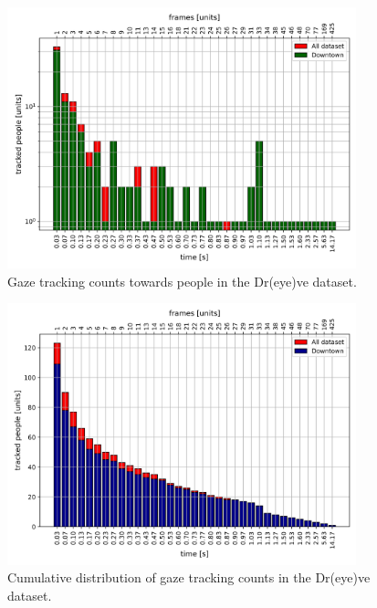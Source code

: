 \begin{figure}
    \centering
    \includegraphics[width=0.9\textwidth]{images/dreyeve/tracking_distrib.png}
    \caption{Gaze tracking counts towards people in the Dr(eye)ve dataset.}
    \label{fig:tracking_distribution}
\end{figure}
\begin{figure}
    \centering
    \includegraphics[width=0.9\textwidth]{images/dreyeve/tracking_distrib_cum.png}
    \caption{Cumulative distribution of gaze tracking counts in the Dr(eye)ve dataset.}
    \label{fig:tracking_cum_distribution}
\end{figure}

